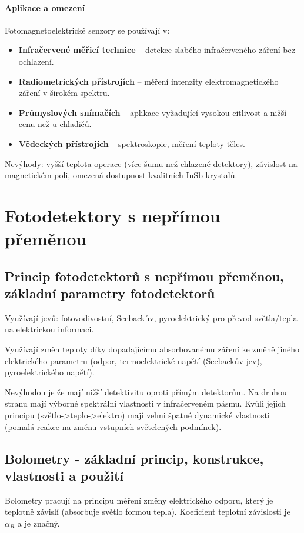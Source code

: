 \documentclass[a4paper, 12pt]{article}
\begin{document}
        \paragraph{Aplikace a omezení}
        Fotomagnetoelektrické senzory se používají v:
        \begin{itemize}
            \item \textbf{Infračervené měřicí technice} -- detekce slabého infračerveného záření bez ochlazení.
            \item \textbf{Radiometrických přístrojích} -- měření intenzity elektromagnetického záření v širokém spektru.
            \item \textbf{Průmyslových snímačích} -- aplikace vyžadující vysokou citlivost a nižší cenu než u chladičů.
            \item \textbf{Vědeckých přístrojích} -- spektroskopie, měření teploty těles.
        \end{itemize}
        
        Nevýhody: vyšší teplota operace (více šumu než chlazené detektory), závislost na magnetickém poli,
        omezená dostupnost kvalitních InSb krystalů.
    
    \section{Fotodetektory s nepřímou přeměnou}
        \subsection{Princip fotodetektorů s nepřímou přeměnou, základní parametry fotodetektorů}
            Využívají jevů: fotovodivostní, Seebackův, pyroelektrický pro převod světla/tepla na elektrickou informaci.

            Využívají změn teploty díky dopadajícímu absorbovanému záření ke změně jiného elektrického parametru
            (odpor, termoelektrické napětí (Seebackův jev), pyroelektrického napětí).

            Nevýhodou je že mají nižší detektivitu oproti přímým detektorům. Na druhou stranu
            mají výborné spektrální vlastnosti v infračerveném pásmu. Kvůli jejich principu (světlo->teplo->elektro)
            mají velmi špatné dynamické vlastnosti (pomalá reakce na změnu vstupních světelených podmínek).

        \subsection{Bolometry - základní princip, konstrukce, vlastnosti a použití}
            Bolometry pracují na principu měření změny elektrického odporu, který je teplotně závislí (absorbuje světlo formou tepla).
            Koeficient teplotní závislosti je $\alpha_R$ a je značný.
\end{document}
